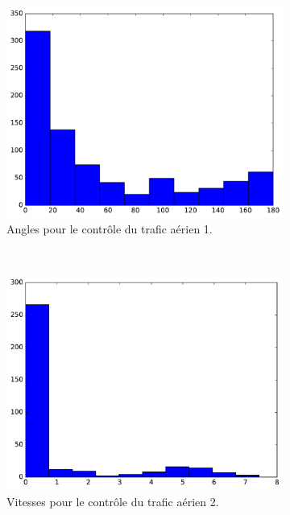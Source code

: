 \begin{figure}
\begin{subfigure}[t]{\subImgWaStats}
			\centering
			\includegraphics[width=\textwidth]{figures/ch3/mhA_angle}
			\caption{Angles pour le contrôle du trafic aérien 1.}
			\label{fig:mhA_angle}
		\end{subfigure}
		~
		\begin{subfigure}[t]{\subImgWaStats}
			\centering
			\includegraphics[width=\textwidth]{figures/ch3/germanwingsA_speed}
			\caption{Vitesses pour le contrôle du trafic aérien 2.}
			\label{fig:germanwingsA_speed}
		\end{subfigure}
		~
		\begin{subfigure}[t]{\subImgWaStats}
			\centering

\end{subfigure}
\end{figure}

